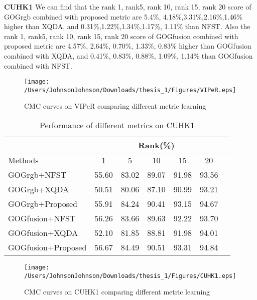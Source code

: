 \textbf{CUHK1} We can find that the rank 1, rank5, rank 10, rank 15, rank 20 score of GOGrgb combined with proposed metric are 5.4\%, 4.18\%,3.31\%,2.16\%,1.46\% higher than XQDA, and 0.31\%,1.22\%,1.34\%,1.17\%, 1.11\% than NFST.  Also the  rank 1, rank5, rank 10, rank 15, rank 20 score of GOGfusion combined with proposed metric are 4.57\%, 2.64\%, 0.70\%, 1.33\%, 0.83\% higher than GOGfusion combined with XQDA, and 0.41\%, 0.83\%, 0.88\%, 1.09\%, 1.14\% than GOGfusion combined with NFST.  

\begin{figure}[H]
\begin{raggedleft}
\texttt{[image: /Users/JohnsonJohnson/Downloads/thesis\_1/Figures/VIPeR.eps]}
\vspace{-3em}
\caption{CMC curves on VIPeR comparing different metric learning}
\end{raggedleft}
\end{figure}

\begin{table}[H]
\caption{Performance of different metrics on CUHK1}
\centering
\begin{tabular}{|l|c|c|c|c|c|c|}
\hline
& \multicolumn{5}{|c|}{Rank(\%)} \\
\hline
Methods& 1 & 5 &10&15& 20\\
\hline
GOGrgb+NFST&55.60 &83.02 &89.07 &91.98&93.56 \\ 
\hline
GOGrgb+XQDA&50.51 &80.06 &87.10 &90.99&93.21 \\ 
\hline
GOGrgb+Proposed&55.91&84.24&90.41& 93.15&94.67\\  %
\hline
GOGfusion+NFST&56.26 &83.66 &89.63 &92.22&93.70 \\ 
\hline
GOGfusion+XQDA&52.10 &81.85&88.81 &91.98&94.01\\ 
\hline
GOGfusion+Proposed&56.67&84.49& 90.51& 93.31&94.84\\
\hline
\end{tabular}\newline
\end{table}


\begin{figure}[H]
\centering
\texttt{[image: /Users/JohnsonJohnson/Downloads/thesis\_1/Figures/CUHK1.eps]}
\vspace{-3em}
\caption{CMC curves on CUHK1 comparing different metric learning}
\end{figure}

